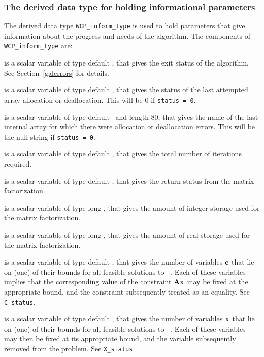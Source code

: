 \documentclass{galahad}
\newcommand{\packagename}{WCP}
\begin{document}

\subsubsection{The derived data type for holding informational
 parameters}\label{typeinform}
The derived data type 
{\tt \packagename\_inform\_type} 
is used to hold parameters that give information about the progress and needs 
of the algorithm. The components of 
{\tt \packagename\_inform\_type} 
are:

\begin{description}

 is a scalar variable of type default \integer, that gives the
exit status of the algorithm. 
See Section~\ref{galerrors}
for details.

 is a scalar variable of type default \integer, that gives
the status of the last attempted array allocation or deallocation.
This will be 0 if {\tt status = 0}.

 is a scalar variable of type default \character\
and length 80, that  gives the name of the last internal array 
for which there were allocation or deallocation errors.
This will be the null string if {\tt status = 0}. 

 is a scalar variable of type default \integer, that gives the
total number of iterations required.

 is a scalar variable of type default \integer, that 
gives the return status from the matrix factorization.

 is a scalar variable of type long
\integer, that gives the amount of integer storage used for the matrix 
factorization.

 is a scalar variable of type long \integer, 
that gives the amount of real storage used for the matrix factorization.

 is a scalar variable of type default \integer, that gives the
number of variables ${\mathbf{c}}$ that lie on (one) of their bounds for all
feasible solutions to \req{prim}--\req{boundary}. Each of these variables 
implies that the corresponding value of the constraint ${\mathbf{A}} {\mathbf{x}}$ may
be fixed at the appropriate bound, and the constraint subsequently treated as
an equality. See {\tt C\_status}.

 is a scalar variable of type default \integer, that gives the
number of variables ${\mathbf{x}}$ that lie on (one) of their bounds for all
feasible solutions to \req{prim}--\req{boundary}. Each of these variables 
may then be fixed at its appropriate bound, and the variable subsequently
removed from the problem.
See {\tt X\_status}.


\end{description}
\end{document}
